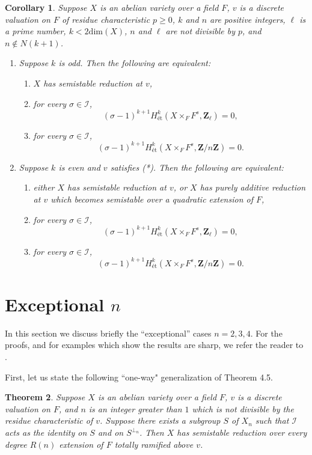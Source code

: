 \documentclass{amsart}
\def\Z{{\mathbf Z}}
\def\I{{\mathcal I}}
\def\dim{\mathrm{dim}}
\newtheorem{thm}{Theorem}[section]
\newtheorem{cor}[thm]{Corollary}
\theoremstyle{definition}
\begin{document}
\begin{cor}
\label{highercohcor}
Suppose $X$ is an abelian variety over a field $F$, $v$ is a discrete 
valuation on $F$ of residue characteristic $p \ge 0$, $k$ and $n$
are positive integers, $\ell$ is a prime number,
$k < 2\dim(X)$, $n$ and $\ell$ are not divisible by $p$, 
and $n \notin N(k+1)$.
\begin{enumerate}
\item[{(i)}] Suppose $k$ is odd. Then the following are
equivalent:
\begin{enumerate}
\item[{(a)}]  $X$ has semistable reduction at $v$,
\item[{(b)}] for every $\sigma \in \I$,
$$(\sigma - 1)^{k+1}H^k_{\text{\'et}}(X \times_F F^s, 
\Z_{\ell}) = 0,$$ 
\item[{(c)}]  for every $\sigma \in \I$,
$$(\sigma - 1)^{k+1}H^k_{\text{\'et}}(X \times_F F^s, \Z/n\Z) = 0.$$ 
\end{enumerate}
\item[{(ii)}] Suppose $k$ is even and $v$ satisfies (*).
Then the following are equivalent:
\begin{enumerate}
\item[{(a)}]  either $X$ has semistable reduction at $v$, or
$X$ has purely additive reduction at $v$ which becomes
semistable over a quadratic extension of $F$,
\item[{(b)}] for every $\sigma \in \I$,
$$(\sigma - 1)^{k+1}H^k_{\text{\'et}}(X \times_F F^s, \Z_{\ell}) = 
0,$$
\item[{(c)}] for every $\sigma \in \I$,
$$(\sigma - 1)^{k+1}H^k_{\text{\'et}}(X \times_F F^s, \Z/n\Z) = 0.$$ 
\end{enumerate}
\end{enumerate}
\end{cor}

\section{Exceptional $n$}
\label{except}
In this section we discuss briefly the ``exceptional'' cases 
$n=2,3,4$. For the proofs, and for examples which show the results
are sharp, we refer the reader to \cite{degree}.

First, let us state the following ``one-way"
generalization of Theorem 4.5.

\begin{thm}
\label{oneway}
Suppose $X$ is an abelian variety over a field $F$, $v$ is a discrete 
valuation on $F$, and $n$ is an integer greater than $1$ which is not 
divisible by the residue characteristic of $v$. 
Suppose there exists a subgroup $S$ of $X_n$
such that $\I$ acts as the identity on $S$ and on $S^{\perp_n}$.
Then $X$ has semistable reduction over every degree $R(n)$
extension of $F$ totally ramified above $v$.
\end{thm}
\end{document}
